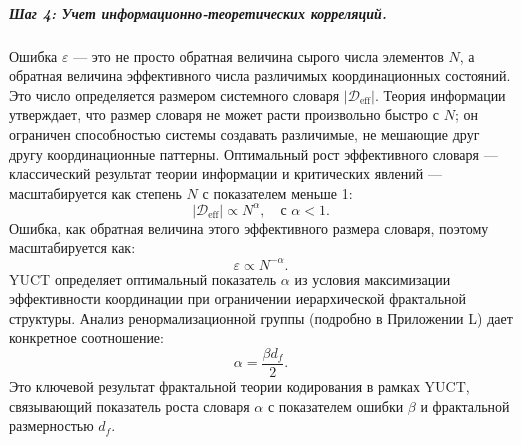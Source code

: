 \documentclass[12pt,a4paper]{article}
\theoremstyle{remark}
\begin{document}
	\subparagraph*{Шаг 4: Учет информационно-теоретических корреляций.}
	Ошибка \(\varepsilon\) — это не просто обратная величина сырого числа элементов \(N\), а обратная величина эффективного числа различимых координационных состояний. Это число определяется размером системного словаря \(|\mathcal{D}_{\text{eff}}|\). Теория информации утверждает, что размер словаря не может расти произвольно быстро с \(N\); он ограничен способностью системы создавать различимые, не мешающие друг другу координационные паттерны. Оптимальный рост эффективного словаря — классический результат теории информации и критических явлений — масштабируется как степень \(N\) с показателем меньше 1:
	\begin{equation}
		|\mathcal{D}_{\text{eff}}| \propto N^{\alpha}, \quad \text{с } \alpha < 1.
		\label{eq:dict_scale}
	\end{equation}
	Ошибка, как обратная величина этого эффективного размера словаря, поэтому масштабируется как:
	\begin{equation}
		\varepsilon \propto N^{-\alpha}.
		\label{eq:error_scale_corrected}
	\end{equation}
	YUCT определяет оптимальный показатель \(\alpha\) из условия максимизации эффективности координации при ограничении иерархической фрактальной структуры. Анализ ренормализационной группы (подробно в Приложении L) дает конкретное соотношение:
	\begin{equation}
		\alpha = \frac{\beta d_f}{2}.
		\label{eq:alpha_from_beta}
	\end{equation}
	Это ключевой результат фрактальной теории кодирования в рамках YUCT, связывающий показатель роста словаря \(\alpha\) с показателем ошибки \(\beta\) и фрактальной размерностью \(d_f\).
	
\end{document}
